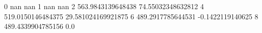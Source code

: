 0 nan nan
1 nan nan
2 563.9843139648438 74.55032348632812
4 519.0150146484375 29.581024169921875
6 489.2917785644531 -0.1422119140625
8 489.4339904785156 0.0
